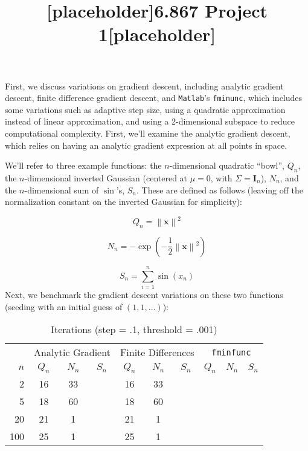 \documentclass[12pt,letterpaper]{article}
\title{[placeholder]6.867 Project 1[placeholder]\vspace{-3.5ex}}
\begin{document}
\maketitle
\vspace{-4em}
\section{}
First, we discuss variations on gradient descent, including analytic gradient descent, finite difference gradient descent, and \texttt{Matlab}'s \texttt{fminunc}, which includes some variations such as adaptive step size, using a quadratic approximation instead of linear approximation, and using a 2-dimensional subspace to reduce computational complexity. First, we'll examine the analytic gradient descent, which relies on having an analytic gradient expression at all points in space.

We'll refer to three example functions: the $n$-dimensional quadratic ``bowl'', $Q_n$, the $n$-dimensional inverted Gaussian (centered at $\mu = 0$, with $\Sigma = \mathbf I_n$), $N_n$, and the $n$-dimensional sum of $\sin$'s, $S_n$. These are defined as follows (leaving off the normalization constant on the inverted Gaussian for simplicity):

\[ Q_n = \left\| \mathbf x \right\| ^2 \]

\[ N_n = -\exp{\left(-\dfrac{1}{2} \left\| \mathbf x \right\| ^2 \right)} \]

\[ S_n = \sum_{i=1}^n \sin(x_n) \]
Next, we benchmark the gradient descent variations on these two functions (seeding with an initial guess of $(1,1,\ldots)$):

\begin{table}[h]
\centering
\caption{Iterations (step = .1, threshold = .001)}
\begin{tabular}{r|ccc|ccc|ccc}
   & \multicolumn{3}{|c}{Analytic Gradient} & \multicolumn{3}{|c}{Finite Differences} & \multicolumn{3}{|c}{\texttt{fminfunc}} \\
$n$& $Q_n$         & $N_n$        & $S_n$ & $Q_n$              & $N_n$ & $S_n$             & $Q_n$         & $N_n$        & $S_n$ \\\hline
2  & 16            & 33           &       & 16                 & 33      &                 &               &              &       \\
5  & 18            & 60           &       & 18                 & 60      &                 &               &              &       \\
20 & 21            &  1           &       & 21                 &  1      &                 &               &              &       \\
100& 25            &  1           &       & 25                 &  1      &                 &               &              &       
\end{tabular}
\end{table}
\end{document}
